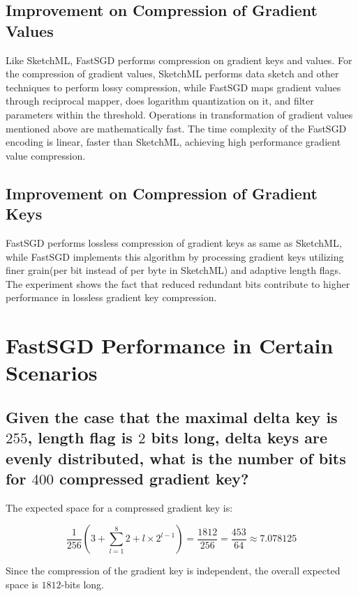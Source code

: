 \documentclass[journal]{IEEEtran}
\begin{document}
\subsection{Improvement on Compression of Gradient Values}

Like SketchML, FastSGD performs compression on gradient keys and values. For the compression of gradient values, SketchML performs data sketch and other techniques to perform lossy compression, while FastSGD maps gradient values through reciprocal mapper, does logarithm quantization on it, and filter parameters within the threshold. Operations in transformation of gradient values mentioned above are mathematically fast. The time complexity of the FastSGD encoding is linear, faster than SketchML, achieving high performance gradient value compression.

\subsection{Improvement on Compression of Gradient Keys}

FastSGD performs lossless compression of gradient keys as same as SketchML, while FastSGD implements this algorithm by processing gradient keys utilizing finer grain(per bit instead of per byte in SketchML) and adaptive length flags. The experiment\cite{https://doi.org/10.48550/arxiv.2112.04291} shows the fact that reduced redundant bits contribute to higher performance in lossless gradient key compression.

\section{FastSGD Performance in Certain Scenarios}

\subsection{Given the case that the maximal delta key is $255$, length flag is $2$ bits long, delta keys are evenly distributed, what is the number of bits for $400$ compressed gradient key?}

The expected space for a compressed gradient key is:

$$
\frac{1}{256}(3 + \sum_{l = 1}^8 2 + l \times 2^{l - 1}) = \frac{1812}{256} = \frac{453}{64} \approx 7.078125
$$

Since the compression of the gradient key is independent\cite{https://doi.org/10.48550/arxiv.2112.04291}, the overall expected space is $1812$-bits long.
\end{document}
